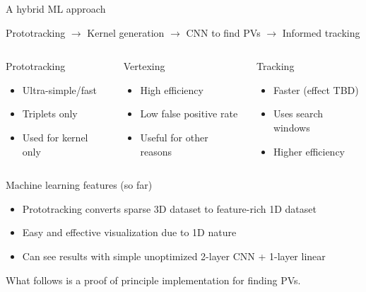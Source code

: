 \begin{frame}{A hybrid ML approach}
\begin{center}
Prototracking $\rightarrow$ Kernel generation $\rightarrow$ CNN to find PVs $\rightarrow$ Informed tracking
\end{center}

\begin{columns}[b]
    \begin{block}{Prototracking}
    \begin{itemize}
        \item Ultra-simple/fast
        \item Triplets only
        \item Used for kernel only
        \end{itemize}
    \end{block}
    \begin{block}{Vertexing}
    \begin{itemize}
        \item High efficiency
        \item Low false positive rate
        \item Useful for other reasons
        \end{itemize}
    \end{block}
    \begin{block}{Tracking}
    \begin{itemize}
        \item Faster (effect TBD)
        \item Uses search windows
        \item Higher efficiency
    \end{itemize}
    \end{block}
\end{columns}
    \begin{block}{Machine learning features (so far)}
        \begin{itemize}
            \item Prototracking converts sparse 3D dataset to feature-rich 1D dataset
            \item Easy and effective visualization due to 1D nature
            \item Can see results with simple unoptimized 2-layer CNN + 1-layer linear
        \end{itemize}
    \end{block}

\vspace{.3em}
\begin{center}
What follows is a proof of principle implementation for finding PVs.
\end{center}
\end{frame}
